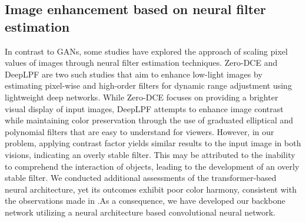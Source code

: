 \subsection{Image enhancement based on neural filter estimation}
In contrast to GANs, some studies have explored the approach of scaling pixel values of images through neural filter estimation techniques\cite{WZF*19, DLT18, BCPS19}. Zero-DCE\cite{GLG*20} and DeepLPF\cite{MMM*20} are two such studies that aim to enhance low-light images by estimating pixel-wise and high-order filters for dynamic range adjustment using lightweight deep networks. While Zero-DCE focuses on providing a brighter visual display of input images, DeepLPF attempts to enhance image contrast while maintaining color preservation through the use of graduated elliptical and polynomial filters that are easy to understand for viewers. However, in our problem, applying contrast factor yields similar results to the input image in both visions, indicating an overly stable filter. This may be attributed to the inability to comprehend the interaction of objects, leading to the development of an overly stable filter. We conducted additional assessments of the transformer-based neural architecture, yet its outcomes exhibit poor color harmony, consistent with the observations made in \cite{PEZZ20}.As a consequence, we have developed our backbone network utilizing a neural architecture based convolutional neural network.